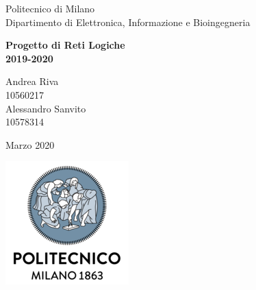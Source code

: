 \documentclass[10pt,english, openany]{book}
\begin{document}

\begin{titlepage}
	\clearpage\thispagestyle{empty}
	\centering
	\vspace{1cm}

	{\normalsize Politecnico di Milano\\
	             Dipartimento di Elettronica, Informazione e 							 Bioingegneria \par}
		\vspace{2cm}
	{\Huge \textbf{Progetto di Reti Logiche\\
	               2019-2020}
	} \\
	\vspace{4cm}
	{\normalsize Andrea Riva\\
	             10560217\\
	             Alessandro Sanvito\\ 
	             10578314\par}
	\vspace{5cm}
	
	{\normalsize Marzo 2020 \par}
	
	\vspace{0.5cm}
    
    \centering \includegraphics[scale=0.6]{logo1.png}
    
    
	\pagebreak

\end{titlepage}

\tableofcontents{}

\mainmatter
\end{document}

